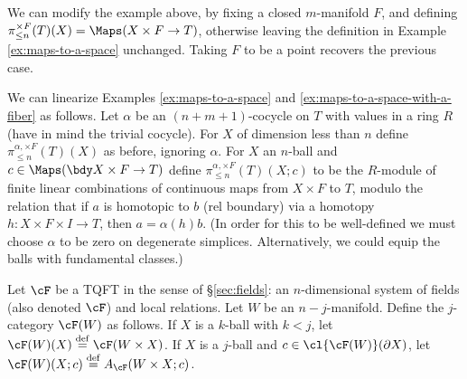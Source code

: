 
\begin{example} \label{ex:maps-with-fiber}
\rm
\label{ex:maps-to-a-space-with-a-fiber}%
We can modify the example above, by fixing a
closed $m$-manifold $F$, and defining $\pi^{\times F}_{\leq n}(T)(X) = \Maps(X \times F \to T)$, 
otherwise leaving the definition in Example \ref{ex:maps-to-a-space} unchanged.
Taking $F$ to be a point recovers the previous case.
\end{example}

\begin{example}
\rm
\label{ex:linearized-maps-to-a-space}%
We can linearize Examples \ref{ex:maps-to-a-space} and \ref{ex:maps-to-a-space-with-a-fiber} as follows.
Let $\alpha$ be an $(n{+}m{+}1)$-cocycle on $T$ with values in a ring $R$
(have in mind the trivial cocycle).
For $X$ of dimension less than $n$ define $\pi^{\alpha, \times F}_{\leq n}(T)(X)$ as before, ignoring $\alpha$.
For $X$ an $n$-ball and $c\in \Maps(\bdy X \times F \to T)$ define $\pi^{\alpha, \times F}_{\leq n}(T)(X; c)$ to be
the $R$-module of finite linear combinations of continuous maps from $X\times F$ to $T$,
modulo the relation that if $a$ is homotopic to $b$ (rel boundary) via a homotopy
$h: X\times F\times I \to T$, then $a = \alpha(h)b$.
(In order for this to be well-defined we must choose $\alpha$ to be zero on degenerate simplices.
Alternatively, we could equip the balls with fundamental classes.)
\end{example}

\begin{example}
\rm
\label{ex:ncats-from-tqfts}%
Let $\cF$ be a TQFT in the sense of \S\ref{sec:fields}: an $n$-dimensional 
system of fields (also denoted $\cF$) and local relations.
Let $W$ be an $n{-}j$-manifold.
Define the $j$-category $\cF(W)$ as follows.
If $X$ is a $k$-ball with $k<j$, let $\cF(W)(X) \deq \cF(W\times X)$.
If $X$ is a $j$-ball and $c\in \cl{\cF(W)}(\bd X)$, 
let $\cF(W)(X; c) \deq A_\cF(W\times X; c)$.
\end{example}


